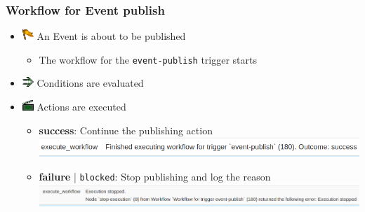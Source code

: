 \begin{frame}
    \frametitle{Workflow for Event publish}
    \begin{itemize}
        \setlength\itemsep{1em}
        \item[] \hspace*{-2em}\includegraphics[width=16px]{pictures/sc-event-icon.png} \hspace*{0.25em} An Event is about to be published
        \begin{itemize}
            \item The workflow for the \texttt{event-publish} trigger starts
        \end{itemize}
        \item[] \hspace*{-2em}\includegraphics[width=16px]{pictures/sc-condition-icon.png} \hspace*{0.25em} Conditions are evaluated
        \item[] \hspace*{-2em}\includegraphics[width=16px]{pictures/sc-action-icon.png} \hspace*{0.25em} Actions are executed
        \begin{itemize}
            \setlength\itemsep{0.75em}
            \item {\bf\color{green!50!black}success}: Continue the publishing action
            \hspace*{-4em}\includegraphics[width=1.0\textwidth]{pictures/log-entry-publish-success.png}
            \item {\bf\color{red}failure} | \texttt{\color{red}blocked}: Stop publishing and log the reason
            \hspace*{-4em}\includegraphics[width=1.0\textwidth]{pictures/log-entry-publish-blocked.png}
        \end{itemize}
    \end{itemize}
\end{frame}

